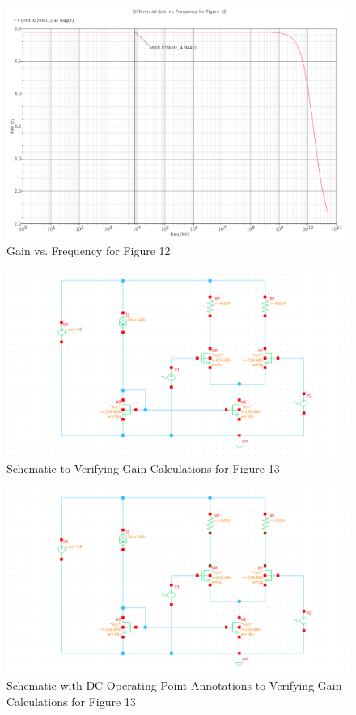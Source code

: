 \documentclass{article}
\begin{document}
\begin{figure}[H]
\centering
\includegraphics[width=6in]{p3_1b_gain}
\caption{Gain vs. Frequency for Figure 12}
\label{3_1b_gain}
\end{figure}

\begin{figure}[H]
\centering
\includegraphics[width=6in]{p3_1c_schem}
\caption{Schematic to Verifying Gain Calculations for Figure 13}
\label{3_1c_schem}
\end{figure}

\begin{figure}[H]
\centering
\includegraphics[width=6in]{p3_1c_dcop}
\caption{Schematic with DC Operating Point Annotations to Verifying Gain Calculations for Figure 13}
\label{3_1c_dcop}
\end{figure}
\end{document}

